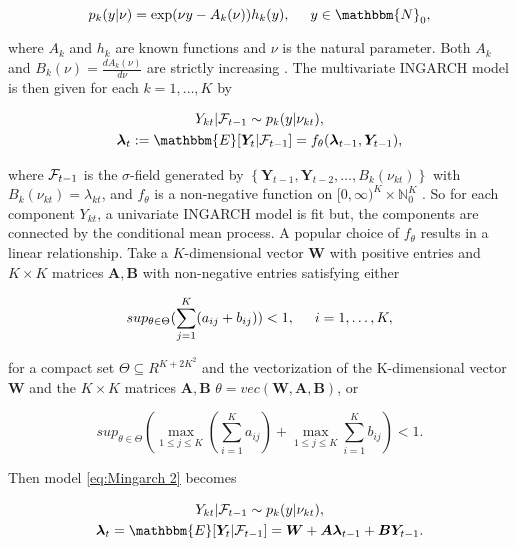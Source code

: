 \begin{equation}
p_{k}(y|\nu) = \exp(\nu y - A_k(\nu))h_k(y), \hspace{0.5cm} y \in \mathbbm{N}_0,
\label{eq:Exponential Family}
\end{equation}

where $A_k$ and $h_k$ are known functions and $\nu$ is the natural parameter. Both $A_k$ and $B_k(\nu) = \frac{d A_k(\nu)}{d \nu}$ are strictly increasing \cite{Lee:2023}. The multivariate INGARCH model is then given for each $k=1,\ldots,K$ by

\begin{equation}
\begin{gathered}
Y_{kt} | \SigA_{t-1} \sim p_k(y|\nu_{kt}), \\
\bm{\lambda}_t := \mathbbm{E}[\bm{Y}_t | \SigA_{t-1}] = f_{\theta}(\bm{\lambda}_{t-1},\bm{Y}_{t-1}),
\label{eq:Mingarch 2}
\end{gathered}
\end{equation}

where $\mathcal{F}_{t-1}$ is the $\sigma$-field generated by $\left\{\bm{Y}_{t-1},\bm{Y}_{t-2},\ldots,B_k(\nu_{kt})\right\}$ with $B_k(\nu_{kt})=\lambda_{kt}$, and $f_{\theta}$ is a non-negative function on $[0,\infty)^K \times \mathbb{N}_0^K$ \cite{Lee:2023}. So for each component $Y_{kt}$, a univariate INGARCH model is fit but, the components are connected by the conditional mean process. A popular choice of $f_{\theta}$ results in a linear relationship. Take a $K$-dimensional vector $\bm{W}$ with positive entries and $K\times K$ matrices $\bm{A},\bm{B}$ with non-negative entries satisfying either \cite{Lee:2023}

\begin{equation}
sup_{\theta \in \Theta} (\sum_{j=1}^K(a_{ij}+b_{ij})) < 1, \hspace{0.5cm} i=1,\ldots,K , 
\label{eq:Mingarch 2 function condition 1}
\end{equation}

for a compact set $\Theta \subseteq R^{K+ 2K^2}$ and the vectorization of the K-dimensional vector $\bm{W}$ and the $K\times K$ matrices $\bm{A},\bm{B}$ $\theta=vec(\bm{W},\bm{A},\bm{B})$, or 

\begin{equation}
sup_{\theta \in \Theta}(\max_{1\leq j \leq K}(\sum_{i=1}^K a_{ij}) + \max_{1\leq j \leq K} \sum_{i=1}^K b_{ij}) < 1. 
\label{eq:Mingarch 2 function condition 2}
\end{equation}

Then model \ref{eq:Mingarch 2} becomes 

\begin{equation}
\begin{gathered}
Y_{kt} | \SigA_{t-1} \sim p_k(y|\nu_{kt}), \\
\bm{\lambda}_t = \mathbbm{E}[\bm{Y}_t | \SigA_{t-1}] = \bm{W} + \bm{A}\bm{\lambda}_{t-1} + \bm{B}\bm{Y}_{t-1}. 
\label{eq:Mingarch 2 linear}
\end{gathered}
\end{equation}

